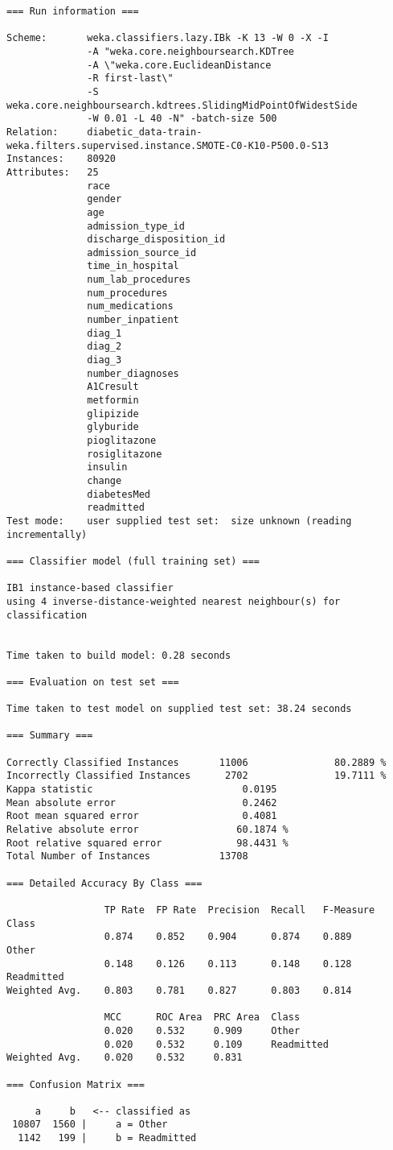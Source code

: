 \documentclass{article}\usepackage[]{graphicx}\usepackage[]{color}
\begin{document}
\begin{verbatim}
=== Run information ===

Scheme:       weka.classifiers.lazy.IBk -K 13 -W 0 -X -I
              -A "weka.core.neighboursearch.KDTree
              -A \"weka.core.EuclideanDistance
              -R first-last\"
              -S weka.core.neighboursearch.kdtrees.SlidingMidPointOfWidestSide
              -W 0.01 -L 40 -N" -batch-size 500
Relation:     diabetic_data-train-weka.filters.supervised.instance.SMOTE-C0-K10-P500.0-S13
Instances:    80920
Attributes:   25
              race
              gender
              age
              admission_type_id
              discharge_disposition_id
              admission_source_id
              time_in_hospital
              num_lab_procedures
              num_procedures
              num_medications
              number_inpatient
              diag_1
              diag_2
              diag_3
              number_diagnoses
              A1Cresult
              metformin
              glipizide
              glyburide
              pioglitazone
              rosiglitazone
              insulin
              change
              diabetesMed
              readmitted
Test mode:    user supplied test set:  size unknown (reading incrementally)

=== Classifier model (full training set) ===

IB1 instance-based classifier
using 4 inverse-distance-weighted nearest neighbour(s) for classification


Time taken to build model: 0.28 seconds

=== Evaluation on test set ===

Time taken to test model on supplied test set: 38.24 seconds

=== Summary ===

Correctly Classified Instances       11006               80.2889 %
Incorrectly Classified Instances      2702               19.7111 %
Kappa statistic                          0.0195
Mean absolute error                      0.2462
Root mean squared error                  0.4081
Relative absolute error                 60.1874 %
Root relative squared error             98.4431 %
Total Number of Instances            13708

=== Detailed Accuracy By Class ===

                 TP Rate  FP Rate  Precision  Recall   F-Measure  Class
                 0.874    0.852    0.904      0.874    0.889      Other
                 0.148    0.126    0.113      0.148    0.128      Readmitted
Weighted Avg.    0.803    0.781    0.827      0.803    0.814

                 MCC      ROC Area  PRC Area  Class
                 0.020    0.532     0.909     Other
                 0.020    0.532     0.109     Readmitted
Weighted Avg.    0.020    0.532     0.831

=== Confusion Matrix ===

     a     b   <-- classified as
 10807  1560 |     a = Other
  1142   199 |     b = Readmitted
\end{verbatim}
\end{document}
